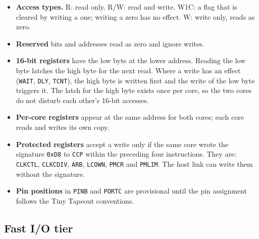 \documentclass[10pt,a4paper]{article}
\newcommand{\reg}[1]{\texttt{#1}}
\begin{document}
\begin{itemize}
\item \textbf{Access types.} R: read only. R/W: read and write. W1C: a flag that is cleared by writing a one;
writing a zero has no effect. W: write only, reads as zero.
\item \textbf{Reserved} bits and addresses read as zero and ignore writes.
\item \textbf{16-bit registers} have the low byte at the lower address. Reading the low byte latches the high
byte for the next read. Where a write has an effect (\reg{WAIT}, \reg{DLY}, \reg{TCNT}), the high byte is written first and
the write of the low byte triggers it. The latch for the high byte exists once per core, so the two cores do
not disturb each other's 16-bit accesses.
\item \textbf{Per-core registers} appear at the same address for both cores; each core reads and writes its own
copy.
\item \textbf{Protected registers} accept a write only if the same core wrote the signature \texttt{0xD8} to
\reg{CCP} within the preceding four instructions. They are: \reg{CLKCTL}, \reg{CLKCDIV}, \reg{ARB},
\reg{LCOWN}, \reg{PMCR} and \reg{PMLIM}. The host link can write them without the signature.
\item \textbf{Pin positions} in \reg{PINB} and \reg{PORTC} are provisional until the pin assignment follows the
Tiny Tapeout conventions.
\end{itemize}

\subsection{Fast I/O tier}
\end{document}

